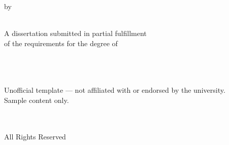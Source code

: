 \documentclass[12pt,letterpaper,twoside]{report}
\begin{document}

\begin{titlepage}
\thispagestyle{empty}
\begin{center}

\vspace*{1.5in}

{\Large\color{nyugray}\docuni}\\[6pt]
{\large\color{nyugray}\docschool}\\[60pt]

{\Huge\bfseries\color{nyuviolet}\doctitle}\\[40pt]

{\large\color{nyugray}by}\\[16pt]

{\LARGE\color{nyugray}\docauthor}\\[80pt]

\begin{minipage}{0.7\textwidth}
\centering
\singlespacing
{\normalsize\color{nyugray}
A dissertation submitted in partial fulfillment\\
of the requirements for the degree of\\
\docdegree\\[10pt]
\docdept\\[24pt]
\docmonth\ \docyear}
\end{minipage}

\vfill

{\footnotesize\color{nyugray!60!white}
Unofficial template --- not affiliated with or endorsed by the university.\\
Sample content only.}

\end{center}
\end{titlepage}

\clearpage
{}
\setcounter{page}{2}

\thispagestyle{plain}
\begin{center}
\vspace*{0.4\textheight}

\textcopyright\ \docyear\\[10pt]
\docauthor\\[10pt]
All Rights Reserved

\vfill
\end{center}










\end{document}
